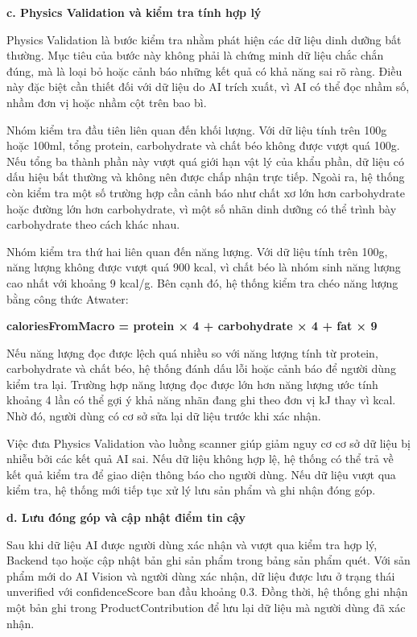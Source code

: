 \textbf{c. Physics Validation và kiểm tra tính hợp lý}

Physics Validation là bước kiểm tra nhằm phát hiện các dữ liệu dinh dưỡng bất thường. Mục tiêu của bước này không phải là chứng minh dữ liệu chắc chắn đúng, mà là loại bỏ hoặc cảnh báo những kết quả có khả năng sai rõ ràng. Điều này đặc biệt cần thiết đối với dữ liệu do AI trích xuất, vì AI có thể đọc nhầm số, nhầm đơn vị hoặc nhầm cột trên bao bì.

Nhóm kiểm tra đầu tiên liên quan đến khối lượng. Với dữ liệu tính trên 100g hoặc 100ml, tổng protein, carbohydrate và chất béo không được vượt quá 100g. Nếu tổng ba thành phần này vượt quá giới hạn vật lý của khẩu phần, dữ liệu có dấu hiệu bất thường và không nên được chấp nhận trực tiếp. Ngoài ra, hệ thống còn kiểm tra một số trường hợp cần cảnh báo như chất xơ lớn hơn carbohydrate hoặc đường lớn hơn carbohydrate, vì một số nhãn dinh dưỡng có thể trình bày carbohydrate theo cách khác nhau.

Nhóm kiểm tra thứ hai liên quan đến năng lượng. Với dữ liệu tính trên 100g, năng lượng không được vượt quá 900 kcal, vì chất béo là nhóm sinh năng lượng cao nhất với khoảng 9 kcal/g. Bên cạnh đó, hệ thống kiểm tra chéo năng lượng bằng công thức Atwater:

\textbf{caloriesFromMacro = protein × 4 + carbohydrate × 4 + fat × 9}

Nếu năng lượng đọc được lệch quá nhiều so với năng lượng tính từ protein, carbohydrate và chất béo, hệ thống đánh dấu lỗi hoặc cảnh báo để người dùng kiểm tra lại. Trường hợp năng lượng đọc được lớn hơn năng lượng ước tính khoảng 4 lần có thể gợi ý khả năng nhãn đang ghi theo đơn vị kJ thay vì kcal. Nhờ đó, người dùng có cơ sở sửa lại dữ liệu trước khi xác nhận.

Việc đưa Physics Validation vào luồng scanner giúp giảm nguy cơ cơ sở dữ liệu bị nhiễu bởi các kết quả AI sai. Nếu dữ liệu không hợp lệ, hệ thống có thể trả về kết quả kiểm tra để giao diện thông báo cho người dùng. Nếu dữ liệu vượt qua kiểm tra, hệ thống mới tiếp tục xử lý lưu sản phẩm và ghi nhận đóng góp.

\textbf{d. Lưu đóng góp và cập nhật điểm tin cậy}

Sau khi dữ liệu AI được người dùng xác nhận và vượt qua kiểm tra hợp lý, Backend tạo hoặc cập nhật bản ghi sản phẩm trong bảng sản phẩm quét. Với sản phẩm mới do AI Vision và người dùng xác nhận, dữ liệu được lưu ở trạng thái unverified với confidenceScore ban đầu khoảng 0.3. Đồng thời, hệ thống ghi nhận một bản ghi trong ProductContribution để lưu lại dữ liệu mà người dùng đã xác nhận.

